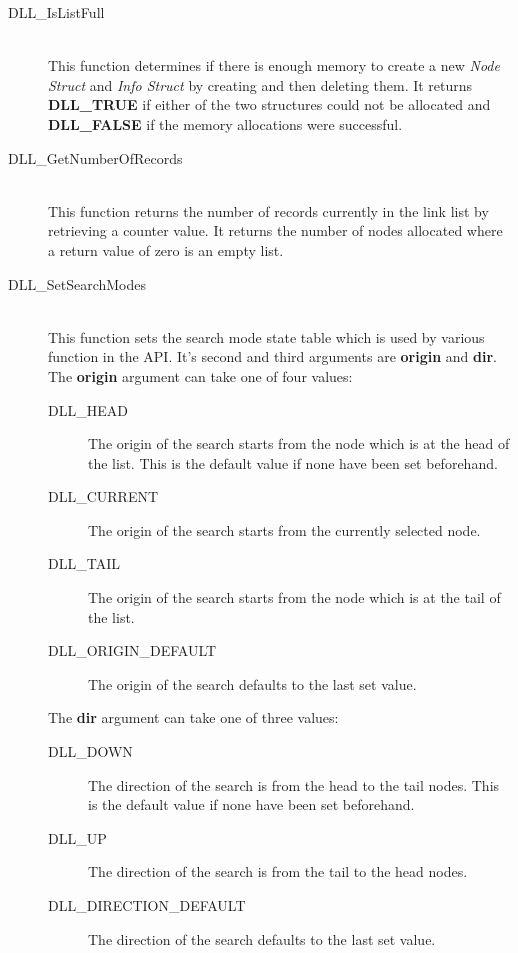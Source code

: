 \documentclass[10pt,letterpaper,titlepage]{article}
\begin{document}
\begin{description}
\begin{description}
 \item[DLL\_IsListFull]\quad\\
 This function determines if there is enough memory to create a new \emph{Node Struct} and \emph{Info Struct} by creating and then deleting them.  It returns \textbf{DLL\_TRUE} if either of the two structures could not be allocated and \textbf{DLL\_FALSE} if the memory allocations were successful.

 \item[DLL\_GetNumberOfRecords]\quad\\
 This function returns the number of records currently in the link list by retrieving a counter value.  It returns the number of nodes allocated where a return value of zero is an empty list.

 \item[DLL\_SetSearchModes]\quad\\
 This function sets the search mode state table which is used by various function in the API.  It's second and third arguments are \textbf{origin} and \textbf{dir}.  The \textbf{origin} argument can take one of four values:

  \begin{description}
  \item[DLL\_HEAD] The origin of the search starts from the node which is at the head of the list.  This is the default value if none have been set beforehand.
  \item[DLL\_CURRENT] The origin of the search starts from the currently selected node.
  \item[DLL\_TAIL] The origin of the search starts from the node which is at the tail of the list.
  \item[DLL\_ORIGIN\_DEFAULT] The origin of the search defaults to the last set value.
  \end{description}

 The \textbf{dir} argument can take one of three values:

  \begin{description}
  \item[DLL\_DOWN] The direction of the search is from the head to the tail nodes.  This is the default value if none have been set beforehand.
  \item[DLL\_UP] The direction of the search is from the tail to the head nodes.
  \item[DLL\_DIRECTION\_DEFAULT] The direction of the search defaults to the last set value.
  \end{description}


\end{description}
\end{description}
\end{document}
